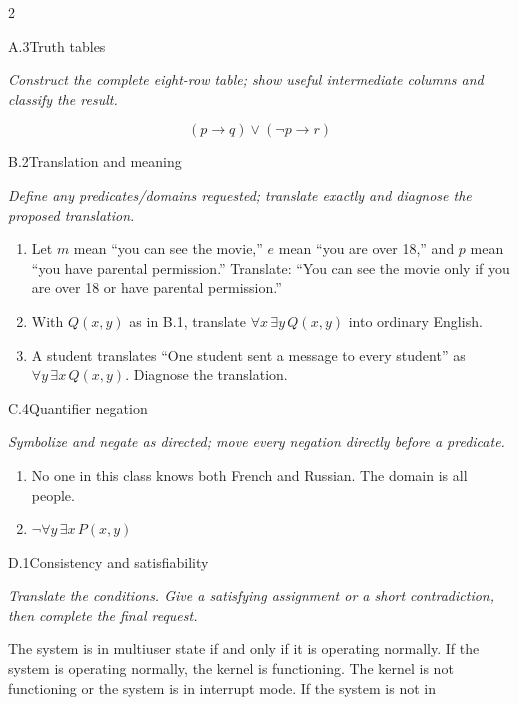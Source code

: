 \documentclass[9pt]{extarticle}
\begin{document}
\CoreWorkArea
\FormBreak
{}
\begin{multicols}{2}
\begin{CoreProblem}{A.3}{Truth tables}
{\scriptsize\textit{Construct the complete eight-row table; show useful intermediate columns and classify the result.}\par}
\[
  (p\to q)\lor(\neg p\to r)
\]
\end{CoreProblem}
\begin{CoreProblem}{B.2}{Translation and meaning}
{\scriptsize\textit{Define any predicates/domains requested; translate exactly and diagnose the proposed translation.}\par}
\begin{enumerate}[label=(\alph*)]
  \item Let $m$ mean ``you can see the movie,'' $e$ mean ``you are over 18,''
        and $p$ mean ``you have parental permission.'' Translate: ``You can
        see the movie only if you are over 18 or have parental permission.''
  \item With $Q(x,y)$ as in B.1, translate $\forall x\,\exists y\,Q(x,y)$
        into ordinary English.
  \item A student translates ``One student sent a message to every student''
        as $\forall y\,\exists x\,Q(x,y)$. Diagnose the translation.
\end{enumerate}
\end{CoreProblem}
\begin{CoreProblem}{C.4}{Quantifier negation}
{\scriptsize\textit{Symbolize and negate as directed; move every negation directly before a predicate.}\par}
\begin{enumerate}[label=(\alph*)]
  \item No one in this class knows both French and Russian. The domain is all
        people.
  \item $\neg\forall y\,\exists x\,P(x,y)$
\end{enumerate}
\end{CoreProblem}
\columnbreak
\begin{CoreProblem}{D.1}{Consistency and satisfiability}
{\scriptsize\textit{Translate the conditions. Give a satisfying assignment or a short contradiction, then complete the final request.}\par}
The system is in multiuser state if and only if it is operating normally. If
the system is operating normally, the kernel is functioning. The kernel is not
functioning or the system is in interrupt mode. If the system is not in

\end{CoreProblem}
\end{multicols}
\end{document}
